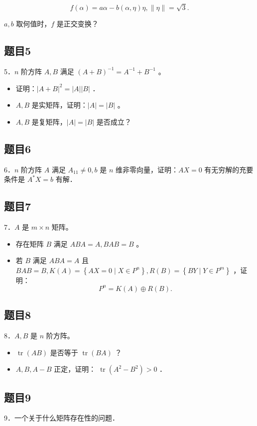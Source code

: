 \documentclass{article}
\begin{document}
\[
f(\alpha)=a \alpha-b(\alpha, \eta) \eta,\|\eta\|=\sqrt{3} .
\]

\(a, b\) 取何值时，\(f\) 是正交变换？

\subsection{题目5}
5．\(n\) 阶方阵 \(A, B\) 满足 \((A+B)^{-1}=A^{-1}+B^{-1}\) 。

\begin{itemize}
  \item[（1）] 证明：\(|A+B|^{2}=|A||B|\) ．
  \item[（2）] \(A, B\) 是实矩阵，证明：\(|A|=|B|\) 。
  \item[（3）] \(A, B\) 是复矩阵，\(|A|=|B|\) 是否成立？
\end{itemize}

\subsection{题目6}
6．\(n\) 阶方阵 \(A\) 满足 \(A_{11} \neq 0, b\) 是 \(n\) 维非零向量，证明：\(A X=0\) 有无穷解的充要条件是 \(A^{*} X=b\) 有解．

\subsection{题目7}
7．\(A\) 是 \(m \times n\) 矩阵。

\begin{itemize}
  \item[（1）] 存在矩阵 \(B\) 满足 \(A B A=A, B A B=B\) 。
  \item[（2）] 若 \(B\) 满足 \(A B A=A\) 且 \(B A B=B, K(A)=\left\{A X=0 \mid X \in P^{n}\right\}, R(B)=\left\{B Y \mid Y \in P^{m}\right\}\) ，证明：
\[
P^{n}=K(A) \oplus R(B) .
\]
\end{itemize}

\subsection{题目8}
8．\(A, B\) 是 \(n\) 阶方阵。

\begin{itemize}
  \item[（1）] \(\operatorname{tr}(A B)\) 是否等于 \(\operatorname{tr}(B A)\) ？
  \item[（2）] \(A, B, A-B\) 正定，证明： \(\operatorname{tr}\left(A^{2}-B^{2}\right)>0\) ．
\end{itemize}

\subsection{题目9}
9．一个关于什么矩阵存在性的问题．
\end{document}
